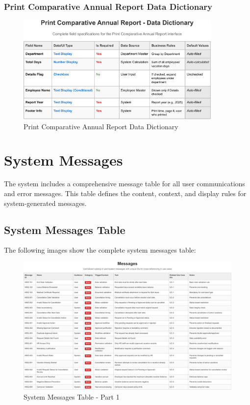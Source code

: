 \documentclass[12pt,a4paper]{article}
\begin{document}
\subsubsection{Print Comparative Annual Report Data Dictionary}
\begin{figure}[H]
\centering
\includegraphics[width=0.9\textwidth]{Data-Dictionary/Screen-Data-Dictionaries/Print-Comparative-Annual-Report-Data-Dictionary/Print-Comparative-Annual-Report-Data-Dictionary-1.png}
\caption{Print Comparative Annual Report Data Dictionary}
\label{fig:print-comparative-annual-data-dict}
\end{figure}

\section{System Messages}

The system includes a comprehensive message table for all user communications and error messages. This table defines the content, context, and display rules for system-generated messages.

\subsection{System Messages Table}
The following images show the complete system messages table:

\begin{figure}[H]
\centering
\includegraphics[width=1.0\textwidth]{Use-Cases/Messages-Table/Messages-Table-1.png}
\caption{System Messages Table - Part 1}
\label{fig:messages-table-1}
\end{figure}
\end{document}
